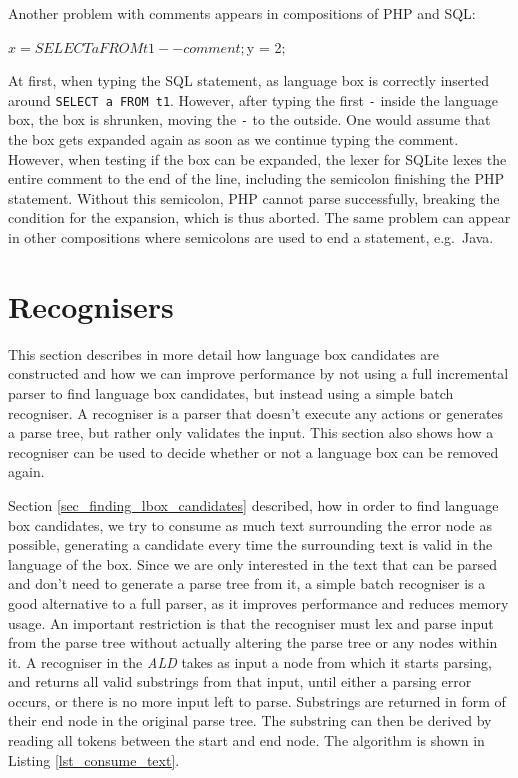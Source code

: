 \documentclass[sigplan,screen]{acmart}\settopmatter{printfolios=true,printccs=false,printacmref=false}
\newcommand{\ald}[0]{\emph{ALD}\xspace}
\begin{document}
Another problem with comments appears in compositions of PHP and SQL:

\begin{lstdefault}[language=PHP]
$x = SELECT a FROM t1 -- comment;
$y = 2;
\end{lstdefault}

At first, when typing the SQL statement, as language box is correctly inserted
around \verb|SELECT a FROM t1|. However, after typing the first \texttt{-}
inside the language box, the box is shrunken, moving the \texttt{-} to the
outside. One would assume that the box gets expanded again as soon as we
continue typing the comment. However, when testing if the box can be expanded,
the lexer for SQLite lexes the entire comment to the end of the line, including
the semicolon finishing the PHP statement. Without this semicolon, PHP cannot
parse successfully, breaking the condition for the expansion, which is thus
aborted. The same problem can appear in other compositions where semicolons are
used to end a statement, e.g.~Java.

\section{Recognisers}
\label{sec:impl_defaultrec}

This section describes in more detail how language box candidates are
constructed and how we can improve performance by not using a full incremental
parser to find language box candidates, but instead using a simple batch
recogniser. A recogniser is a parser that doesn't execute any actions or
generates a parse tree, but rather only validates the input. This section also
shows how a recogniser can be used to decide whether or not a language box can
be removed again.

Section \ref{sec_finding_lbox_candidates} described, how in order to find
language box candidates, we try to consume as much text surrounding the error
node as possible, generating a candidate every time the surrounding text is
valid in the language of the box. Since we are only interested in the text that
can be parsed and don't need to generate a parse tree from it, a simple batch
recogniser is a good alternative to a full parser, as it improves performance
and reduces memory usage.  An important restriction is that the recogniser must
lex and parse input from the parse tree without actually altering the parse
tree or any nodes within it.  A recogniser in the \ald takes as input a node
from which it starts parsing, and returns all valid substrings from that input,
until either a parsing error occurs, or there is no more input left to parse.
Substrings are returned in form of their end node in the original parse tree.
The substring can then be derived by reading all tokens between the start and
end node.  The algorithm is shown in Listing \ref{lst_consume_text}.
\end{document}
